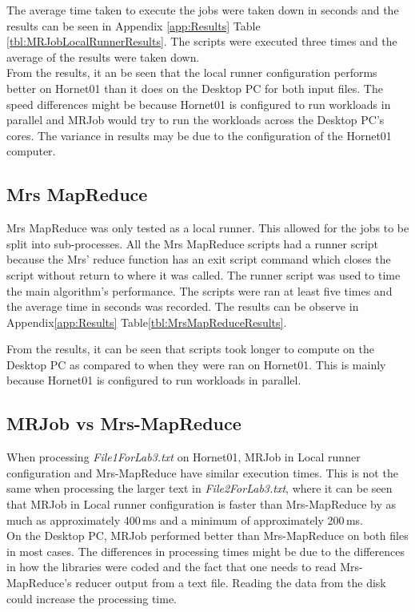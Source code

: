 \documentclass[10pt, twocolumn]{article}
\begin{document}
\noindent The average time taken to execute the jobs were taken down in seconds and the results can be seen in Appendix \ref*{app:Results} Table\,\ref{tbl:MRJobLocalRunnerResults}.
\noindent The scripts were executed three times and the average of the results were taken down.\\

 \noindent From the results, it an be seen that the local runner configuration performs better on Hornet01 than it does on the Desktop PC for both input files. The speed differences might be because Hornet01 is configured to run workloads in parallel and MRJob would try to run the workloads across the Desktop PC's cores. The variance in results may be due to the configuration of the Hornet01 computer.
\subsection{Mrs MapReduce}
%
Mrs MapReduce was only tested as a local runner. This allowed for the jobs to be split into sub-processes. All the Mrs MapReduce scripts had a runner script because the Mrs' reduce function has an exit script command which closes the script without return to where it was called. The runner script was used to time the main algorithm's performance. The scripts were ran at least five times and the average time in seconds was recorded. The results can be observe in Appendix\;\;\ref*{app:Results} Table\;\;\ref{tbl:MrsMapReduceResults}.

\noindent From the results, it can be seen that scripts took longer to compute on the Desktop PC as compared to when they were ran on Hornet01. This is mainly because Hornet01 is configured to run workloads in parallel.
%
\subsection{MRJob vs Mrs-MapReduce}
When processing \emph{File1ForLab3.txt} on Hornet01, MRJob in Local runner configuration and Mrs-MapReduce have similar execution times. This is not the same when processing the larger text in \emph{File2ForLab3.txt}, where it can be seen that MRJob in Local runner configuration is faster than Mrs-MapReduce by as much as approximately 400\,ms and a minimum of approximately 200\,ms.\\

\noindent On the Desktop PC, MRJob performed better than Mrs-MapReduce on both files in most cases. The differences in processing times might be due to the differences in how the libraries were coded and the fact that one needs to read Mrs-MapReduce's reducer output from a text file. Reading the data from the disk could increase the processing time.
\end{document}
